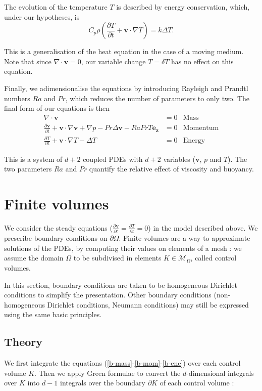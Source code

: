\documentclass[12pt]{article}
\newcommand{\vb}[1]{\ensuremath{\mathbf{#1}}}
\begin{document}
The evolution of the temperature $T$ is described by energy
conservation, which, under our hypotheses, is
\begin{equation}
  C_p \rho \left(\frac{\partial T}{\partial t} + \vb{v} \cdot \nabla T\right) = k \Delta T.
\end{equation}

This is a generalisation of the heat equation in the case of a moving
medium. Note that since $\nabla \cdot \vb{v} = 0$, our variable change
$T = \delta T$ has no effect on this equation.

Finally, we adimensionalise the equations by introducing Rayleigh and
Prandtl numbers $Ra$ and $Pr$, which reduces the number of parameters
to only two. The final form of our equations is then
\begin{align}
  \label{b-mass}
  \nabla \cdot \vb{v} &= 0& \text{Mass}\\
  \label{b-mom}
  \frac{\partial \mathbf{v}}{\partial t} + \mathbf{v} \cdot
  \nabla \mathbf{v} +\nabla p - Pr \Delta \vb{v} - Ra Pr T
  \vb{e_z} &= 0& \text{Momentum}\\
  \label{b-ene}
  \frac{\partial T}{\partial t} + \vb{v} \cdot \nabla T - \Delta
  T&=0& \text{Energy}
\end{align}

This is a system of $d + 2$ coupled PDEs with $d+2$ variables
($\vb{v}$, $p$ and $T$). The two parameters $Ra$ and $Pr$ quantify the
relative effect of viscosity and buoyancy.

\section{Finite volumes}
We consider the steady equations ($\frac{\partial \vb{v}}{\partial t}
= \frac{\partial T}{\partial t} = 0$) in the model described above. We
prescribe boundary conditions on $\partial \Omega$. Finite volumes are
a way to approximate solutions of the PDEs, by computing their values
on elements of a mesh : we assume the domain $\Omega$ to be subdivised
in elements $K \in \mathcal{M}_\Omega$, called control volumes.

In this section, boundary conditions are taken to be homogeneous
Dirichlet conditions to simplify the presentation. Other boundary
conditions (non-homogeneous Dirichlet conditions, Neumann conditions)
may still be expressed using the same basic principles.
\subsection{Theory}
We first integrate the equations
(\ref{b-mass}-\ref{b-mom}-\ref{b-ene}) over each control volume
$K$. Then we apply Green formulae to convert the $d$-dimensional
integrals over $K$ into $d-1$ integrals over the boundary $\partial K$
of each control volume :
\end{document}
